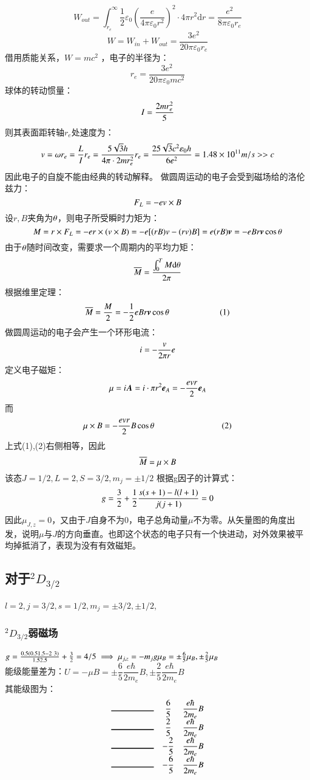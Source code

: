 \documentclass[UTF8,9pt]{ctexart}
\begin{document}
        $$W_{out}= \int _ { r_e } ^ { \infty } \frac { 1 } { 2 } \varepsilon _ { 0 } \left( \frac { e } { 4 \pi \varepsilon _ { 0 } r ^ { 2 } } \right) ^ { 2 } \cdot 4 \pi r ^ { 2 } \mathrm { d } r = \frac { e ^ { 2 } } { 8 \pi \varepsilon _ { 0 } r_e }$$
        $$W=W_{in}+W_{out}=\frac { 3e ^ { 2 } } { 20 \pi \varepsilon _ { 0 } r_e }$$
        借用质能关系，$W= m c^2$ ，电子的半径为： $$r_e = \frac{3e^2}{20\pi \varepsilon_0 m c^2} $$
        球体的转动惯量：
        $$I=\frac{2mr_e^2}{5}$$
        则其表面距转轴$r_e$处速度为：
        $$v=\omega r_e=\frac{L}{I}r_e=\frac{5\sqrt{3}h}{4\pi\cdot 2mr_e^2}r_e=\frac{25 \sqrt{3} c^2 \varepsilon_0 h}{6e^2}=1.48\times 10^{11}m/s>>c$$
        因此电子的自旋不能由经典的转动解释。
        做圆周运动的电子会受到磁场给的洛伦兹力： 
        $$F_L=-ev\times B$$
        设$r,B$夹角为$\theta$，则电子所受瞬时力矩为：
        $$M=r\times F_L=-er\times(v\times B)=-e[(rB)v-(rv)B]=e(rB)\bm{v}=-eBr\bm{v}\cos\theta$$
        由于$\theta$随时间改变，需要求一个周期内的平均力矩：
        $$\overline{M}=\frac{\int_0^TM\mathrm{d} \theta}{2\pi}$$
        根据维里定理：
        $$\overline{M}=\frac{M}{2}=-\frac{1}{2}eBr\bm{v}\cos\theta \qquad\qquad\qquad(1)$$
        做圆周运动的电子会产生一个环形电流：
        $$i=-\frac{v}{2\pi r}e$$
        定义电子磁矩：
        $$\mu=i\bm{A}=i\cdot\pi r^2\bm{e}_A=-\frac{evr}{2}\bm{e}_A$$
        而
        $$\mu\times B=-\frac{evr}{2}B\cos\theta\label{eq2}\qquad\qquad\qquad\qquad(2)$$
        上式(1),(2)右侧相等，因此$$\overline{M}=\mu\times B$$
        该态$J=1/2,L=2,S=3/2,m_j=\pm1/2$
        根据g因子的计算式：
        $$g=\frac{3}{2}+\frac{1}{2}\frac{s(s+1)-l(l+1)}{j(j+1)}=0$$
        因此$\mu_{J,z}=0$，又由于$J$自身不为0，电子总角动量$\mu$不为零。从矢量图的角度出发，说明$\mu$与$J$的方向垂直。也即这个状态的电子只有一个快进动，对外效果被平均掉抵消了，表现为没有有效磁矩。
    \subsection{对于${}^2D_{3/2}$}
        $l=2,j=3/2,s=1/2,m_j=\pm3/2,\pm1/2$,
        \subsubsection{${}^2D_{3/2}$弱磁场}
            $g=\frac{0.5 (0.5 1.5-2\ 3)}{1.5 2.5}+\frac{3}{2}=4/5 \implies \mu_{j,z}=-m_jg\mu_B=\pm\frac{6}{5}\mu_B,\pm\frac{2}{5}\mu_B$\\
            能级能量差为：$U=-\mu B=\pm\dfrac{6}{5}\dfrac{e\hbar}{2m_e} B,\pm\dfrac{2}{5}\dfrac{e\hbar}{2m_e}B$\\
            其能级图为：$$\begin{matrix}
                \rule{50pt}{1pt}&  \dfrac{6}{5} &\dfrac{e\hbar}{2m_e} B\\
                \rule{50pt}{1pt}& \dfrac{2}{5} &\dfrac{e\hbar}{2m_e} B\\
                \rule{50pt}{1pt}&- \dfrac{2}{5} &\dfrac{e\hbar}{2m_e} B\\
                \rule{50pt}{1pt}& -\dfrac{6}{5} &\dfrac{e\hbar}{2m_e} B
            \end{matrix}$$
\end{document}
